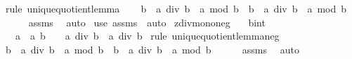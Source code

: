 \begin{isabellebody}
%
\isadelimproof
%
\endisadelimproof
%
\isatagproof
{}\isamarkupfalse%
\ {\isacharparenleft}{\kern0pt}rule\ unique{\isacharunderscore}{\kern0pt}quotient{\isacharunderscore}{\kern0pt}lemma{\isacharparenright}{\kern0pt}\isanewline
\ \ \isamarkupfalse%
\ {\isachardoublequoteopen}b\ {\isacharasterisk}{\kern0pt}\ {\isacharparenleft}{\kern0pt}a\ div\ b{\isacharparenright}{\kern0pt}\ {\isacharplus}{\kern0pt}\ a\ mod\ b\ {\isasymle}\ b\ {\isacharasterisk}{\kern0pt}\ {\isacharparenleft}{\kern0pt}a{\isacharprime}{\kern0pt}\ div\ b{\isacharparenright}{\kern0pt}\ {\isacharplus}{\kern0pt}\ a{\isacharprime}{\kern0pt}\ mod\ b{\isachardoublequoteclose}\isanewline
\ \ \ \ \isamarkupfalse%
\ assms{\isacharparenleft}{\kern0pt}{}{\isacharparenright}{\kern0pt}\ \isamarkupfalse%
\ auto\isanewline
{}\isamarkupfalse%
\ {\isacharparenleft}{\kern0pt}use\ assms\ \ auto{\isacharparenright}{\kern0pt}%
\endisatagproof
{\isafoldproof}%
%
\isadelimproof
\isanewline
%
\endisadelimproof
\isanewline
{}\isamarkupfalse%
\ zdiv{\isacharunderscore}{\kern0pt}mono{}{\isacharunderscore}{\kern0pt}neg{\isacharcolon}{\kern0pt}\isanewline
\ \ \ b{\isacharcolon}{\kern0pt}{\isacharcolon}{\kern0pt}int\isanewline
\ \ \ {\isachardoublequoteopen}a\ {\isasymle}\ a{\isacharprime}{\kern0pt}{\isachardoublequoteclose}\ {\isachardoublequoteopen}b\ {\isacharless}{\kern0pt}\ {}{\isachardoublequoteclose}\ \ {\isachardoublequoteopen}a{\isacharprime}{\kern0pt}\ div\ b\ {\isasymle}\ a\ div\ b{\isachardoublequoteclose}\isanewline
%
\isadelimproof
%
\endisadelimproof
%
\isatagproof
{}\isamarkupfalse%
\ {\isacharparenleft}{\kern0pt}rule\ unique{\isacharunderscore}{\kern0pt}quotient{\isacharunderscore}{\kern0pt}lemma{\isacharunderscore}{\kern0pt}neg{\isacharparenright}{\kern0pt}\isanewline
\ \ \isamarkupfalse%
\ {\isachardoublequoteopen}b\ {\isacharasterisk}{\kern0pt}\ {\isacharparenleft}{\kern0pt}a\ div\ b{\isacharparenright}{\kern0pt}\ {\isacharplus}{\kern0pt}\ a\ mod\ b\ {\isasymle}\ b\ {\isacharasterisk}{\kern0pt}\ {\isacharparenleft}{\kern0pt}a{\isacharprime}{\kern0pt}\ div\ b{\isacharparenright}{\kern0pt}\ {\isacharplus}{\kern0pt}\ a{\isacharprime}{\kern0pt}\ mod\ b{\isachardoublequoteclose}\isanewline
\ \ \ \ \isamarkupfalse%
\ assms{\isacharparenleft}{\kern0pt}{}{\isacharparenright}{\kern0pt}\ \isamarkupfalse%
\ auto\isanewline
{}\isamarkupfalse%

\end{isabellebody}
